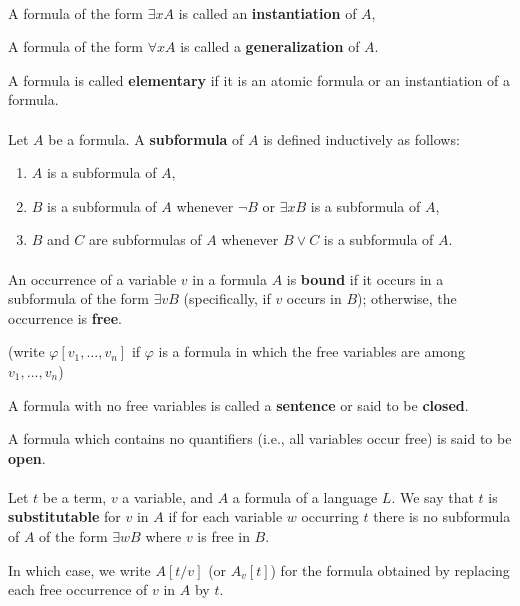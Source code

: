 \documentclass[12pt]{article}
\newlength{\myparskip}
\newenvironment{fullbox}{\begin{lrbox}{\savefullbox}\begin{minipage}{\dimexpr\textwidth-2\fboxsep\relax}\setlength{\parskip}{\myparskip}}{\end{minipage}\end{lrbox}\framebox[\textwidth]{\usebox{\savefullbox}}}
\newenvironment{pbox}[1][]{\begin{fullbox}\def\temp{#1}\ifx\temp\empty\else\paragraph{#1}\phantom{}\fi}{\end{fullbox}}
\theoremstyle{definition}
\renewcommand{\phi}{\varphi}
\newcommand{\<}{\langle}
\renewcommand{\>}{\rangle}
\newcommand{\keyword}{\textbf}
\begin{document}
\begin{pbox}
    A formula of the form $\exists x A$ is called an \keyword{instantiation} of $A$,

    A formula of the form $\forall x A$ is called a \keyword{generalization} of $A$.

    A formula is called \keyword{elementary} if it is an atomic formula or an instantiation of a formula.
\end{pbox}


\begin{pbox}
    Let $A$ be a formula.
    A \keyword{subformula} of $A$ is defined inductively as follows:
    \begin{enumerate}
        \item $A$ is a subformula of $A$,
        \item $B$ is a subformula of $A$ whenever $\lnot B$ or $\exists x B$ is a subformula of $A$,
        \item $B$ and $C$ are subformulas of $A$ whenever $B \lor C$ is a subformula of $A$.
    \end{enumerate}
\end{pbox}

\begin{pbox}
    An occurrence of a variable $v$ in a formula $A$ is \keyword{bound} if it occurs in a subformula of the form $\exists v B$ (specifically, if $v$ occurs in $B$); otherwise, the occurrence is \keyword{free}.

    (write $\phi[v_1, \dots, v_n]$ if $\phi$ is a formula in which the free variables are among $v_1, \dots, v_n$)

    A formula with no free variables is called a \keyword{sentence} or said to be \keyword{closed}.

    A formula which contains no quantifiers (i.e., all variables occur free) is said to be \keyword{open}.
\end{pbox}

\begin{pbox}
    Let $t$ be a term, $v$ a variable, and $A$ a formula of a language $L$.
    We say that $t$ is \keyword{substitutable} for $v$ in $A$ if for each variable $w$ occurring $t$ there is no subformula of $A$ of the form $\exists w B$ where $v$ is free in $B$.

    In which case, we write $A[t/v]$ (or $A_v[t]$) for the formula obtained by replacing each free occurrence of $v$ in $A$ by $t$.
\end{pbox}
\end{document}
